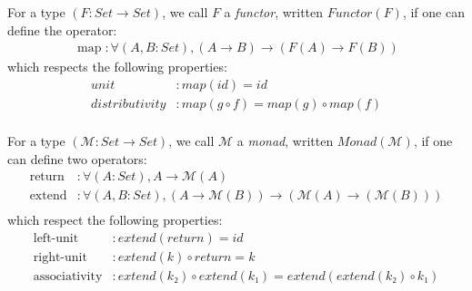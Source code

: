 \documentclass{article}
\begin{document}

\begin{definition}
For a type $(F : Set → Set)$, we call $F$ a \emph{functor}, written $Functor(F)$, if one can define the operator:
\begin{align*}
\operatorname{map} : ∀ (A , B : Set), (A → B) → (F(A) → F(B))
\end{align*}
which respects the following properties:
\begin{align*}
          unit &: map(id) = id                  \\
distributivity &: map(g ∘ f) = map(g) ∘ map(f)  \\
\end{align*}
\end{definition}

\begin{definition}
For a type $(ℳ  : Set → Set)$, we call $ℳ $ a \emph{monad}, written $Monad(ℳ )$, if one can define two operators:
\begin{align*}
\operatorname{return} &: ∀ (A : Set), A → ℳ (A)                          \\
\operatorname{extend} &: ∀ (A, B : Set), (A → ℳ (B)) → (ℳ (A) → (ℳ (B))) \\
\end{align*}
which respect the following properties:
\begin{align*}
    \operatorname{left-unit} &: extend(return) = id                               \\
   \operatorname{right-unit} &: extend(k) ∘ return = k                            \\
\operatorname{associativity} &: extend(k₂) ∘ extend(k₁) = extend(extend(k₂) ∘ k₁) \\
\end{align*}
\end{definition}
\end{document}

